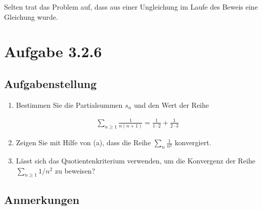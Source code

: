 \documentclass[a4paper]{article}
\begin{document}
Selten trat das Problem auf, dass aus einer Ungleichung im Laufe des Beweis eine Gleichung wurde.

\section{Aufgabe 3.2.6}

\subsection{Aufgabenstellung}

\begin{enumerate}
  \item Bestimmen Sie die Partialsummen $s_n$ und den Wert der Reihe

    \begin{align}
      \sum_{n\ge 1} \frac{1}{n(n+1)} = \frac{1}{1\cdot 2}+\frac{1}{2\cdot 3}
    \end{align}

  \item Zeigen Sie mit Hilfe von (a), dass die Reihe $\sum_n \frac 1{n^2}$ konvergiert.

  \item Lässt sich das Quotientenkriterium verwenden, um die Konvergenz der Reihe $\sum_{n\ge 1} 1/{n^2}$ zu beweisen?
\end{enumerate}

\subsection{Anmerkungen}
\end{document}
